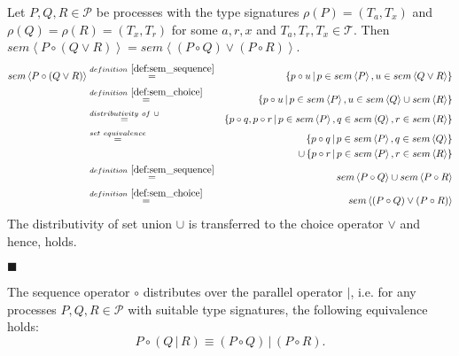 \begin{myproof}
Let $P, Q, R \in \mathcal{P}$ be processes with the type signatures $\rho \left( P \right) = \left( T_a, T_x \right)$ and $\rho \left( Q \right) = \rho \left( R \right) = \left( T_x, T_r \right)$ for some $a, r, x$ and $T_a, T_r, T_x \in \mathcal{T}$. Then $sem \left\langle P \circ \left( Q \vee R \right) \right\rangle = sem \left\langle \left( P \circ Q \right) \vee \left( P \circ R \right) \right\rangle$.
\begin{eqnarray*}
  sem \left\langle P \circ \left( Q \vee R \right) \right\rangle & \overset{\defref{def:sem_sequence}}{=} & \left\{ p \circ u \,|\, p \in sem \left\langle P \right\rangle, u \in sem \left\langle Q \vee R \right\rangle \right\} \\
  & \overset{\defref{def:sem_choice}}{=} & \left\{ p \circ u \,|\, p \in sem \left\langle P \right\rangle, u \in sem \left\langle Q \right\rangle \cup sem \left\langle R \right\rangle \right\} \\
  & \overset{distributivity \ of \ \cup}{=} & \left\{ p \circ q, p \circ r \,|\, p \in sem \left\langle P \right\rangle, q \in sem \left\langle Q \right\rangle, r \in sem \left\langle R \right\rangle \right\} \\
  & \overset{set \ equivalence}{=} & \hspace*{0.8em} \left\{ p \circ q \,|\, p \in sem \left\langle P \right\rangle, q \in sem \left\langle Q \right\rangle \right\} \\  
  & & \cup \left\{ p \circ r \,|\, p \in sem \left\langle P \right\rangle, r \in sem \left\langle R \right\rangle \right\} \\
  & \overset{\defref{def:sem_sequence}}{=} & sem \left\langle P \circ Q \right\rangle \cup sem \left\langle P \circ R \right\rangle \\
  & \overset{\defref{def:sem_choice}}{=} & sem \left\langle \left( P \circ Q \right) \vee \left( P \circ R \right) \right\rangle
\end{eqnarray*}
The distributivity of set union $\cup$ is transferred to the choice operator $\vee$ and hence,  holds.

\hfill$\blacksquare$
\end{myproof}

\begin{theorem}
\label{thm:distributivity_sequence_parallel}
The sequence operator $\circ$ distributes over the parallel operator $|$, i.e. for any processes $P, Q, R \in \mathcal{P}$ with suitable type signatures, the following equivalence holds:
\begin{equation*}
  P \circ \left( Q \,|\, R \right) \equiv \left( P \circ Q \right) \,|\, \left( P \circ R \right). 
\end{equation*}
\end{theorem}

